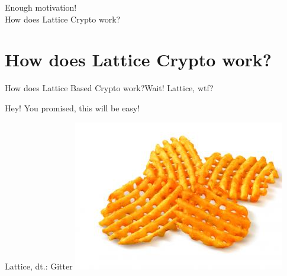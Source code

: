 \begin{frame}[plain]
    \centering\Large
    Enough motivation!\\[1em]
    How does Lattice Crypto work?
\end{frame}

\section{How does Lattice Crypto work?}
\begin{frame}{How does Lattice Based Crypto work?}{Wait! Lattice, wtf?}
\end{frame}

\begin{frame}{Hey! You promised, this will be easy!}
    \begin{block}{Lattice, dt\@.: Gitter}
        \centering
        \includegraphics[keepaspectratio, width=\textwidth, height=0.5\textheight]{data/gitterkartoffel.jpg}
    \end{block}
\end{frame}

